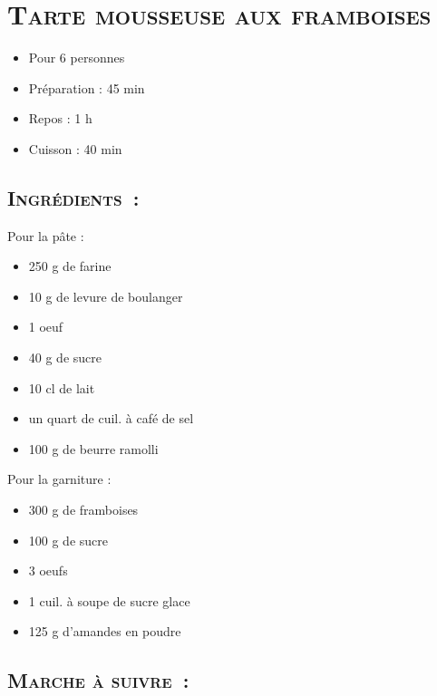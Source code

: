 \section[\normalsize{Tarte mousseuse aux framboises}]{\LARGE{\textsc{Tarte mousseuse aux framboises}}}		%


\begin{itemize}
\item Pour 6 personnes
\item Préparation : 45 min
\item Repos : 1 h
\item Cuisson : 40 min
\end{itemize}

\subsection*{\textsc{Ingr\'edients~:}}

Pour la p\^ate :
\begin{itemize}
\item	250 g de farine
\item	10 g de levure de boulanger
\item	1 oeuf
\item	40 g de sucre
\item	10 cl de lait
\item	un quart de cuil. à caf\'e de sel
\item	100 g de beurre ramolli
\end{itemize}
Pour la garniture :
\begin{itemize}
\item	300 g de framboises
\item	100 g de sucre
\item	3 oeufs
\item	1 cuil. à soupe de sucre glace
\item	125 g d’amandes en poudre
\end{itemize}


\subsection*{\textsc{Marche \`a suivre~:}}

